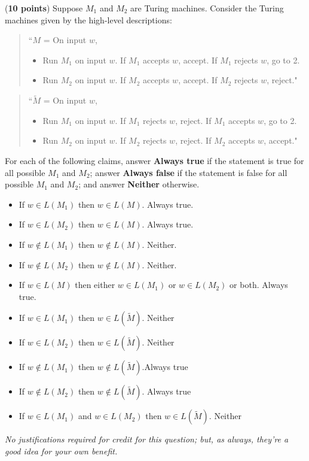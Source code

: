 \documentclass[10pt,letterpaper,unboxed,cm]{hmcpset}
\begin{document}
\begin{problem}[3.] ({\bf 10 points}) 
Suppose $M_1$ and $M_2$ are Turing machines. Consider the Turing machines given by the
high-level descriptions:
\begin{quote}
``$M$ = On input $w$,
\begin{itemize}
\item[1.] Run $M_1$ on input $w$.  If $M_1$ accepts $w$, accept.  If $M_1$ rejects $w$, go to 2.
\item[2.] Run $M_2$ on input $w$. If $M_2$ accepts $w$, accept.  If $M_2$ rejects $w$, reject."
\end{itemize}
\end{quote}
\begin{quote}
``$\tilde{M}$ = On input $w$,
\begin{itemize}
\item[1.] Run $M_1$ on input $w$.  If $M_1$ rejects $w$, reject.  If $M_1$ accepts $w$, go to 2.
\item[2.] Run $M_2$ on input $w$. If $M_2$ rejects $w$, reject.  If $M_2$ accepts $w$, accept."
\end{itemize}
\end{quote}


For each of the following claims, answer {\bf Always true} if the statement is true for all possible $M_1$
and $M_2$; answer {\bf Always false}  if the statement is false for all possible $M_1$
and $M_2$; and answer {\bf Neither} otherwise.
\begin{itemize}
\item[a.] If $w \in L(M_1)$ then $w \in L(M)$. \qquad  Always true.
\item[b.] If $w \in L(M_2)$ then $w \in L(M)$. \qquad Always true.
\item[c.] If $w \notin L(M_1)$ then $w \notin L(M)$. \qquad Neither.
\item[d.] If $w \notin L(M_2)$ then $w \notin L(M)$.  \qquad Neither.
\item[e.] If $w \in L(M)$ then either $w \in L(M_1)$ or $w \in L(M_2)$ or both. \qquad Always true.
\item[f.] If $w \in L(M_1)$ then $w \in L(\tilde{M})$. \qquad Neither
\item[g.] If $w \in L(M_2)$ then $w \in L(\tilde{M})$.  \qquad Neither
\item[h.] If $w \notin L(M_1)$ then $w \notin L(\tilde{M})$.\qquad Always true
\item[i.] If $w \notin L(M_2)$ then $w \notin L(\tilde{M})$. \qquad Always true
\item[j.] If $w \in L(M_1)$  and $w \in L(M_2)$ then $w \in L(\tilde{M})$. \qquad Neither
\end{itemize}


{\it No justifications required for credit for this question; but, as always, they're a good idea for your own benefit.}


\end{problem}
\end{document}
